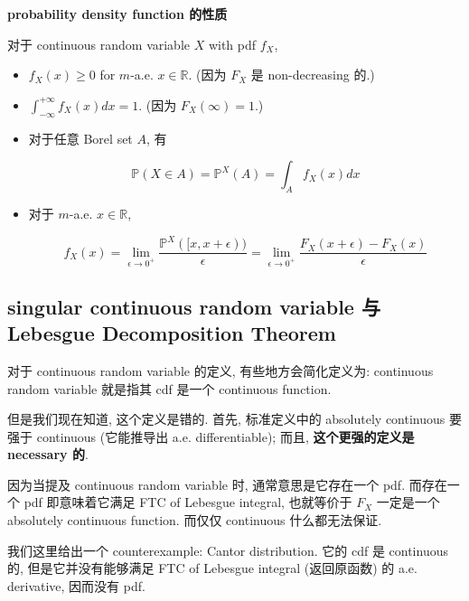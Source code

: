 \documentclass{qlnotes-export}
\begin{document}
\begin{proposition}{\protect{}\label{kn-probability-density-function}{\textbf{probability
density function 的性质}}}

对于 continuous random variable \(X\) with pdf \(f_{X}\),

\begin{itemize}
\item
  \(f_{X}(x) \geq 0\) for \(m\)-a.e. \(x \in {\mathbb{R}}\). (因为 \(F_{X}\) 是 non-decreasing 的.)
\item
  \(\int_{- \infty}^{+ \infty}f_{X}(x) dx = 1\). (因为 \(F_{X}(\infty) = 1\).)
\item
  对于任意 Borel set \(A\), 有

  \[{\mathbb{P}}(X \in A) = {\mathbb{P}}^{X}(A) = \int_{A}f_{X}(x) dx\]
\item
  对于 \(m\)-a.e. \(x \in {\mathbb{R}}\),

  \[f_{X}(x) = \lim\limits_{\epsilon\rightarrow 0^{+}}\frac{{\mathbb{P}}^{X}(\lbrack x,x + \epsilon))}{\epsilon} = \lim\limits_{\epsilon\rightarrow 0^{+}}\frac{F_{X}(x + \epsilon) - F_{X}(x)}{\epsilon}\]
\end{itemize}

\end{proposition}

\subsection{singular continuous random variable 与 Lebesgue Decomposition Theorem}\label{singular-continuous-random-variable-ux4e0e-lebesgue-decomposition-theorem}

对于 continuous random variable 的定义, 有些地方会简化定义为: continuous random variable 就是指其 cdf 是一个 continuous function.

但是我们现在知道, 这个定义是错的. 首先, 标准定义中的 absolutely continuous 要强于 continuous (它能推导出 a.e. differentiable); 而且, \textbf{这个更强的定义是 necessary 的}.

因为当提及 continuous random variable 时, 通常意思是它存在一个 pdf. 而存在一个 pdf 即意味着它满足 FTC of Lebesgue integral, 也就等价于 \(F_{X}\) 一定是一个 absolutely continuous function. 而仅仅 continuous 什么都无法保证.

我们这里给出一个 counterexample: Cantor distribution. 它的 cdf 是 continuous 的, 但是它并没有能够满足 FTC of Lebesgue integral (返回原函数) 的 a.e. derivative, 因而没有 pdf.
\end{document}
